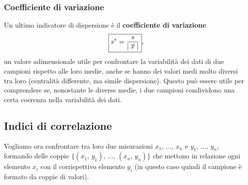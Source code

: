 
\subsubsection{Coefficiente di variazione}
Un ultimo indicatore di dispersione è il \textbf{coefficiente di variazione}
\[
\boxed{
    \mathnormal{s}^* = \frac{\mathnormal{s}}{\mid \overline{x} \mid}
},
\]
un valore adimensionale utile per confrontare la variabilità dei dati di due campioni rispetto alle loro medie, anche se hanno dei valori medi molto diversi tra loro (centralità differente, ma simile dispersione). Questo può essere utile per comprendere se, nonostante le diverse medie, i due campioni condividono una certa coerenza nella variabilità dei dati.

\subsection{Indici di correlazione}
Vogliamo ora confrontare tra loro due misurazioni $x_1, \, \dots, \, x_n$ e $y_1,\, \dots, \, y_n$, formando delle coppie \linebreak \mbox{$\{(x_1,\, y_1),\, \dots,\,(x_n,\,y_n)\}$} che mettono in relazione ogni elemento $x_i$ con il corrispettivo elemento $y_i$ (in questo caso quindi il campione è formato da coppie di valori).

